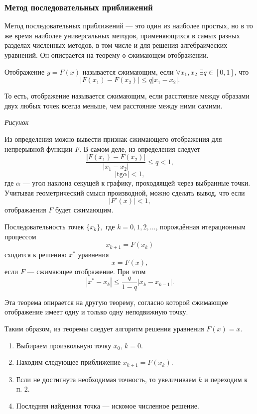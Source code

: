 \subsubsection{Метод последовательных приближений}

Метод последовательных приближений — это один из наиболее простых,
но в то же время наиболее универсальных методов, применяющихся в самых
разных разделах численных методов, в том числе и для решения алгебраических
уравнений. Он описрается на теорему о сжимающем отображении.
\begin{defn}
Отображение $y=F(x)$ называется сжимающим, если $\forall x_{1},x_{2}$
$\exists q\in[0,1]$, что
\[
|F(x_{1})-F(x_{2})|\leqslant q|x_{1}-x_{2}|.
\]

\end{defn}
То есть, отображение называется сжимающим, если расстояние между образами
двух любых точек всегда меньше, чем расстояние между ними самими.

\emph{Рисунок}

Из определения можно вывести признак сжимающего отображения для непрерывной
функции $F$. В самом деле, из определения следует
\[
\frac{|F(x_{1})-F(x_{2})|}{|x_{1}-x_{2}|}\leqslant q<1,
\]
\[
|\mathrm{tg}\alpha|<1,
\]
где $\alpha$ — угол наклона секущей к графику, проходяящей через
выбранные точки. Учитывая геометрический смысл производной, можно
сделать вывод, что если
\[
|F'(x)|<1,
\]
отображаения $F$ будет сжимающим.
\begin{thm}
Последовательность точек $\{x_{k}\},$ где $k=0,1,2,\dots$, порождённая
итерационным процессом 
\[
x_{k+1}=F(x_{k})
\]
 сходится к решению $x^{*}$ уравнения 
\[
x=F(x),
\]
если $F$ — сжимающее отображение. При этом
\[
|x^{*}-x_{k}|\leqslant\frac{q}{1-q}|x_{k}-x_{k-1}|.
\]

\end{thm}
Эта теорема опирается на другую теорему, согласно которой сжимающее
отображение имеет одну и только одну неподвижную точку.

Таким образом, из теоремы следует алгоритм решения уравнения $F(x)=x$. 
\begin{enumerate}
\item Выбираем произвольную точку $x_{0},\, k=0$.
\item Находим следующее приближение $x_{k+1}=F(x_{k})$.
\item Если не достигнута необходимая точность, то увеличиваем $k$ и переходим
к п. 2.
\item Последняя найденная точка — искомое численное решение.
\end{enumerate}

